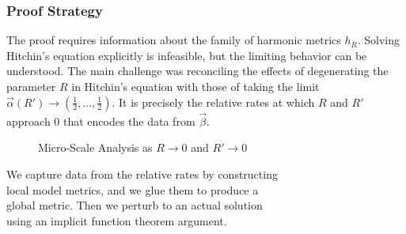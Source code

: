 \documentclass[aspectratio=1610,10pt]{beamer}
\theoremstyle{definition}
\theoremstyle{named}
\begin{document}
\begin{frame}
    \frametitle{Proof Strategy}
    The proof requires information about the family of harmonic metrics $h_R$.  Solving Hitchin's equation explicitly is infeasible, but the limiting behavior can be understood.
    \vfill
    \pause
    The main challenge was reconciling the effects of degenerating the parameter $R$ in Hitchin's equation with those of taking the limit $\vec\alpha(R')\to(\frac12,\dots,\frac12)$.  It is precisely the relative rates at which $R$ and $R'$ approach 0 that encodes the data from $\vec\beta$.
    \vfill
    \pause
    \begin{figure}
    \vspace{-45pt}
    \captionsetup{justification=centering}
    \caption{Micro-Scale Analysis as $R\to0$ and $R'\to0$}
    \end{figure}
    We capture data from the relative rates by constructing\\ local model metrics, and we glue them to produce a\\ global metric.  Then we perturb to an actual solution\\ using an implicit function theorem argument.
    \vfill
\end{frame}
\end{document}
